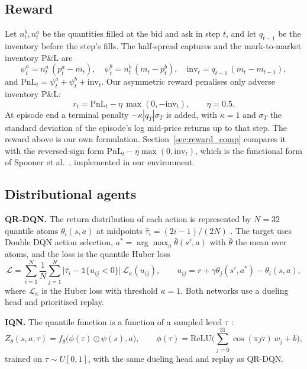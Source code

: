 \documentclass[10pt,twocolumn]{article}
\begin{document}
\subsection{Reward}
\label{sec:reward}
Let $n^b_t,n^a_t$ be the quantities filled at the bid and ask in step $t$, and let $q_{t-1}$ be the inventory before the step's fills. The half-spread captures and the mark-to-market inventory P\&L are
\begin{equation}
  \psi^a_t=n^a_t\,(p^a_t-m_t),\quad
  \psi^b_t=n^b_t\,(m_t-p^b_t),\quad
  \mathrm{inv}_t=q_{t-1}\,(m_t-m_{t-1}),
\end{equation}
and $\mathrm{PnL}_t=\psi^a_t+\psi^b_t+\mathrm{inv}_t$. Our asymmetric reward penalises only adverse inventory P\&L:
\begin{equation}
  r_t=\mathrm{PnL}_t-\eta\,\max(0,-\mathrm{inv}_t),\qquad \eta=0.5.
  \label{eq:reward}
\end{equation}
At episode end a terminal penalty $-\kappa|q_T|\sigma_T$ is added, with $\kappa=1$ and $\sigma_T$ the standard deviation of the episode's log mid-price returns up to that step. The reward above is our own formulation. Section~\ref{sec:reward_comp} compares it with the reversed-sign form $\mathrm{PnL}_t-\eta\max(0,\mathrm{inv}_t)$, which is the functional form of Spooner et al.\ \citep{spooner2018}, implemented in our environment.

\subsection{Distributional agents}
\textbf{QR-DQN.} The return distribution of each action is represented by $N=32$ quantile atoms $\theta_i(s,a)$ at midpoints $\hat\tau_i=(2i-1)/(2N)$ \citep{dabney2018qr}. The target uses Double DQN action selection, $a^*=\arg\max_a \bar\theta(s',a)$ with $\bar\theta$ the mean over atoms, and the loss is the quantile Huber loss
\begin{equation}
  \mathcal L=\sum_{i=1}^{N}\frac1N\sum_{j=1}^{N}
  \big|\hat\tau_i-\mathbb 1\{u_{ij}<0\}\big|\,\mathcal L_\kappa(u_{ij}),\qquad
  u_{ij}=r+\gamma\theta_j(s',a^*)-\theta_i(s,a),
\end{equation}
where $\mathcal L_\kappa$ is the Huber loss with threshold $\kappa=1$. Both networks use a dueling head and prioritised replay.

\textbf{IQN.} The quantile function is a function of a sampled level $\tau$ \citep{dabney2018iqn}:
\begin{equation}
  Z_\theta(s,a,\tau)=f_\theta\big(\phi(\tau)\odot\psi(s),a\big),\qquad
  \phi(\tau)=\mathrm{ReLU}\Big(\sum_{j=0}^{31}\cos(\pi j\tau)\,w_j+b\Big),
\end{equation}
trained on $\tau\sim U[0,1]$, with the same dueling head and replay as QR-DQN.
\end{document}
